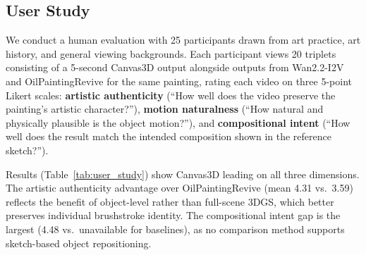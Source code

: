 \begin{table}[t]
\centering
\caption{\textbf{Ablation results.} Each row removes one component.}
\label{tab:ablations}
\end{table}

\subsection{User Study}

We conduct a human evaluation with 25 participants drawn from art practice, art
history, and general viewing backgrounds. Each participant views 20 triplets
consisting of a 5-second Canvas3D output alongside outputs from Wan2.2-I2V and
OilPaintingRevive for the same painting, rating each video on three 5-point
Likert scales: \textbf{artistic authenticity} (``How well does the video
preserve the painting's artistic character?''), \textbf{motion naturalness}
(``How natural and physically plausible is the object motion?''), and
\textbf{compositional intent} (``How well does the result match the intended
composition shown in the reference sketch?'').

Results (Table~\ref{tab:user_study}) show Canvas3D leading on all three
dimensions. The artistic authenticity advantage over OilPaintingRevive (mean
4.31 vs.\ 3.59) reflects the benefit of object-level rather than full-scene
3DGS, which better preserves individual brushstroke identity. The compositional
intent gap is the largest (4.48 vs.\ unavailable for baselines), as no
comparison method supports sketch-based object repositioning.

